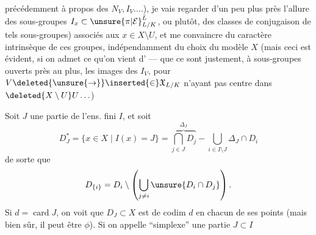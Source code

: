 
précédemment à propos des $N_V,I_V\ldots.$), je vais regarder d'un peu plus près l'allure des sous-groupes $I_x\subset\unsure{\pi|\mathcal E}_{L/K}^{\bar L}$, ou  plutôt, des classes de \inserted{$\pi$-}conjugaison de tels sous-groupes) associés aux $x\in X\setminus U$,  et me convaincre du caractère intrinsèque de ces groupes, indépendamment du choix du modèle $X$ (mais ceci est évident, si on admet ce qu'on vient d' --- que ce sont justement, à sous-groupes ouverts près  au plus, les images des $I_V$, pour $V\deleted{\unsure{\to}}\inserted{\in}\mathfrak X_{L/K}$ n'ayant pas  centre dans $\deleted{X\setminus U}U\ldots$)


Soit $J$ une partie de l'ens. fini $I$, et soit
\[
D_J^*=\{x\in X\mid I(x)=J\}
=\overbrace{\bigcap_{j\in J}D_j}^{\Delta_J}-\bigcup_{i\in I\setminus J}\Delta_J\cap D_i
\]
de sorte que
\[
D_{\{i\}}=D_i\setminus\left(\bigcup_{j\ne i}\unsure{D_i\cap D_j}\right).
\]
Si $d=\operatorname{card}J$, on voit que $D_J\subset X$ est  de codim $d$ en chacun de ses points (mais bien sûr, il peut être $\phi$). Si on appelle ``simplexe'' une partie $J\subset I$


